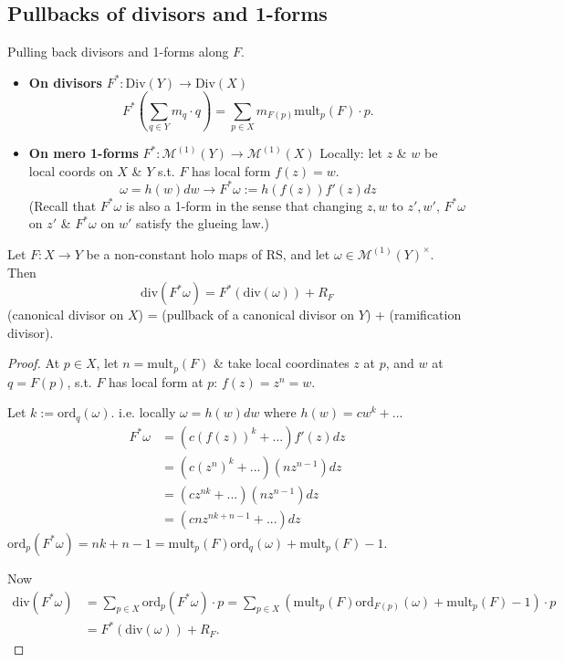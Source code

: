 \documentclass{article}
\begin{document}
\subsection{Pullbacks of divisors and 1-forms}

Pulling back divisors and 1-forms along $F$.
\begin{itemize}
    \item \textbf{On divisors}
    $F^*: \text{Div}(Y) \to \text{Div}(X)$
    \[
    F^* (\sum_{q \in Y} m_q \cdot q) = \sum_{p \in X} m_{F(p)} \text{mult}_p(F) \cdot p.
    \]
    \item \textbf{On mero 1-forms}
    $F^*: \mathcal{M}^{(1)}(Y) \to \mathcal{M}^{(1)}(X)$
    Locally: let $z$ \& $w$ be local coords on $X$ \& $Y$ s.t. $F$ has local form $f(z) = w$.
    \[
    \omega = h(w) dw \longrightarrow F^* \omega := h(f(z)) f'(z) dz
    \]
    (Recall that $F^*\omega$ is also a 1-form in the sense that changing $z, w$ to $z', w'$, $F^*\omega$ on $z'$ \& $F^*\omega$ on $w'$ satisfy the glueing law.)
\end{itemize}

\begin{lemma}
    Let $F: X \to Y$ be a non-constant holo maps of RS, and let $\omega \in \mathcal{M}^{(1)}(Y)^\times$. Then
    \[
    \text{div}(F^* \omega) = F^*(\text{div}(\omega)) + R_F
    \]
    (canonical divisor on $X$) = (pullback of a canonical divisor on $Y$) + (ramification divisor).
\end{lemma}
\begin{proof}
    At $p \in X$, let $n = \text{mult}_p(F)$ \& take local coordinates $z$ at $p$, and $w$ at $q = F(p)$, s.t. $F$ has local form at $p$:
    $f(z) = z^n = w$.
    
    Let $k := \text{ord}_q(\omega)$. i.e. locally $\omega = h(w) dw$ where $h(w) = c w^k + ...$
    \begin{align*}
        F^* \omega &= (c (f(z))^k + ...) f'(z) dz \\
        &= (c (z^n)^k + ...) (n z^{n-1}) dz \\
        &= (c z^{nk} + ...) (n z^{n-1}) dz \\
        &= (c n z^{nk + n - 1} + ...) dz
    \end{align*}
    $\text{ord}_p(F^* \omega) = nk + n - 1 = \text{mult}_p(F) \text{ord}_q(\omega) + \text{mult}_p(F) - 1$.
    
    Now
    \begin{align*}
        \text{div}(F^* \omega) &= \sum_{p \in X} \text{ord}_p(F^* \omega) \cdot p = \sum_{p \in X} (\text{mult}_p(F) \text{ord}_{F(p)}(\omega) + \text{mult}_p(F) - 1) \cdot p \\
        &= F^*(\text{div}(\omega)) + R_F.
    \end{align*}
\end{proof}
\end{document}
